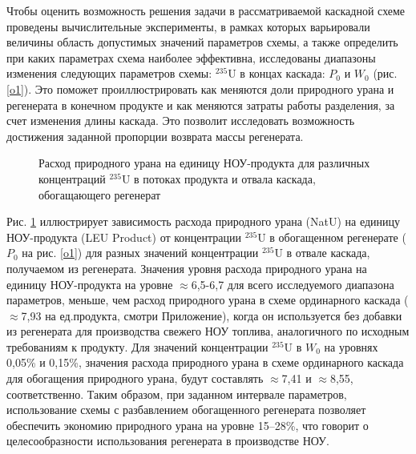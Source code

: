 Чтобы оценить возможность решения задачи в рассматриваемой каскадной схеме проведены вычислительные эксперименты, в рамках которых варьировали величины область допустимых значений параметров схемы, а также определить при каких параметрах схема наиболее эффективна, исследованы диапазоны изменения следующих параметров схемы: $^{235}$U в концах каскада: $P_0$ и $W_0$ (рис. \ref{o1}). Это поможет проиллюстрировать как меняются доли природного урана и регенерата в конечном продукте и как меняются затраты работы разделения, за счет изменения длины каскада. Это позволит исследовать возможность достижения заданной пропорции возврата массы регенерата. 

\begin{figure}[ht]
  \caption{Расход природного урана на единицу НОУ-продукта  для различных концентраций $^{235}$U в потоках продукта и отвала каскада, обогащающего регенерат}\label{fig:sc2_2}
\end{figure}

Рис. \ref{fig:sc2_2} иллюстрирует зависимость расхода природного урана (NatU) на единицу НОУ-продукта (LEU Product) от концентрации $^{235}$U в обогащенном регенерате ($P_0$ на рис. \ref{o1}) для разных значений концентрации $^{235}$U в отвале каскада, получаемом из регенерата. Значения уровня расхода природного урана на единицу НОУ-продукта на уровне $\approx$6,5-6,7 для всего исследуемого диапазона параметров, меньше, чем расход природного урана в схеме ординарного каскада ($\approx$7,93 на ед.продукта, смотри Приложение), когда он используется без добавки из регенерата для производства свежего НОУ топлива, аналогичного по исходным требованиям к продукту. Для значений концентрации $^{235}$U в $W_0$ на уровнях 0,05\% и 0,15\%, значения расхода природного урана в схеме ординарного каскада для обогащения природного урана, будут составлять $\approx$7,41 и $\approx$8,55, соответственно. Таким образом, при заданном интервале параметров, использование схемы с разбавлением обогащенного регенерата позволяет обеспечить экономию природного урана на уровне 15--28\%, что говорит о целесообразности использования регенерата в производстве НОУ.

